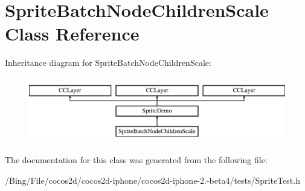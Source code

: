 \hypertarget{interface_sprite_batch_node_children_scale}{\section{Sprite\-Batch\-Node\-Children\-Scale Class Reference}
\label{interface_sprite_batch_node_children_scale}
}
Inheritance diagram for Sprite\-Batch\-Node\-Children\-Scale\-:\begin{figure}[H]
\begin{center}
\leavevmode
\includegraphics[height=2.871795cm]{interface_sprite_batch_node_children_scale}
\end{center}
\end{figure}


The documentation for this class was generated from the following file\-:\begin{DoxyCompactItemize}
\item 
/\-Bing/\-File/cocos2d/cocos2d-\/iphone/cocos2d-\/iphone-\/2.-\/beta4/tests/Sprite\-Test.\-h\end{DoxyCompactItemize}
